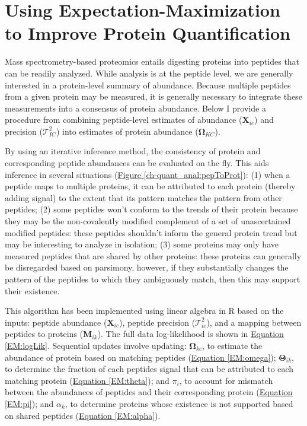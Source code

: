 \chapter{Using Expectation-Maximization to Improve Protein Quantification \label{proteomicsEM}}

Mass spectrometry-based proteomics entails digesting proteins into peptides that can be readily analyzed. While analysis is at the peptide level, we are generally interested in a protein-level summary of abundance. Because multiple peptides from a given protein may be measured, it is generally necessary to integrate these measurements into a consensus of protein abundance. Below I provide a procedure from combining peptide-level estimates of abundance (\textbf{X}$_{ic}$) and precision ($\mathcal{T}^{2}_{IC}$) into estimates of protein abundance ($\mathbf{\Omega}_{KC}$). 

By using an iterative inference method, the consistency of protein and corresponding peptide abundances can be evaluated on the fly. This aids inference in several situations (\hyperref[ch-quant_anal:pepToProt]{Figure \ref{ch-quant_anal:pepToProt}}): (1) when a peptide maps to multiple proteins, it can be attributed to each protein (thereby adding signal) to the extent that its pattern matches the pattern from other peptides; (2) some peptides won't conform to the trends of their protein because they may be the non-covalently modified complement of a set of unascertained modified peptides: these peptides shouldn't inform the general protein trend but may be interesting to analyze in isolation; (3) some proteins may only have measured peptides that are shared by other proteins: these proteins can generally be disregarded based on parsimony, however, if they substantially changes the pattern of the peptides to which they ambiguously match, then this may support their existence.

This algorithm has been implemented using linear algebra in R based on the inputs: peptide abundance (\textbf{X}$_{ic}$), peptide precision ($\mathcal{T}^{2}_{ic}$), and a mapping between peptides to proteins (\textbf{M}$_{ik}$). The full data log-likelihood is shown in \hyperref[EM:logLik]{Equation \ref{EM:logLik}}. Sequential updates involve updating: $\mathbf{\Omega}_{kc}$, to estimate the abundance of protein based on matching peptides (\hyperref[EM:theta]{Equation \ref{EM:omega}}); $\mathbf{\Theta}_{ik}$, to determine the fraction of each peptides signal that can be attributed to each matching protein (\hyperref[EM:theta]{Equation \ref{EM:theta}}); and $\pi_{i}$, to account for mismatch between the abundances of peptides and their corresponding protein (\hyperref[EM:pi]{Equation \ref{EM:pi}}); and $\alpha_{k}$, to determine proteins whose existence is not supported based on shared peptides  (\hyperref[EM:alpha]{Equation \ref{EM:alpha}}).


